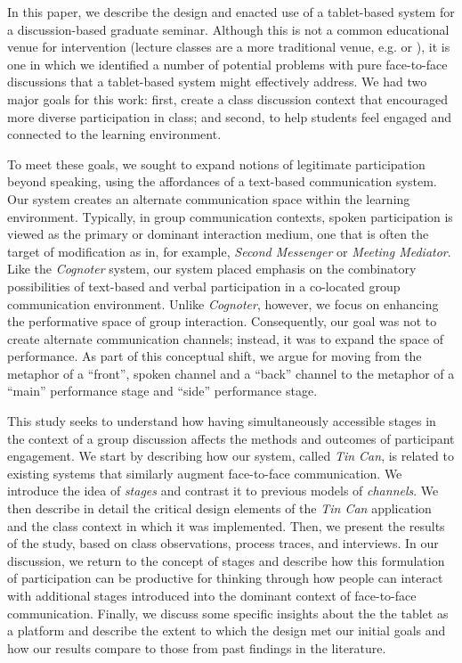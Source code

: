 In this paper, we describe the design and enacted use of a tablet-based system for a discussion-based graduate seminar. Although this is not a common educational venue for intervention (lecture classes are a more traditional venue, e.g. \citep{Kam:2005wb} or \citep{Bergstrom:wl}), it is one in which we identified a number of potential problems with pure face-to-face discussions that a tablet-based system might effectively address. We had two major goals for this work: first, create a class discussion context that encouraged more diverse participation in class; and second, to help students feel engaged and connected to the learning environment. 

To meet these goals, we sought to expand notions of legitimate participation beyond speaking, using the affordances of a text-based communication system. Our system creates an alternate communication space within the learning environment. Typically, in group communication contexts, spoken participation is viewed as the primary or dominant interaction medium, one that is often the target of modification as in, for example, \emph{Second Messenger}\citep{DiMicco:2007ie} or \emph{Meeting Mediator}\citep{Kim:2008ip}. Like the \emph{Cognoter}\citep{Tatar:1991jq} system, our system placed emphasis on the combinatory possibilities of text-based and verbal participation in a co-located group communication environment.  Unlike \emph{Cognoter}, however, we focus on enhancing the performative space of group interaction. Consequently, our goal was not to create alternate communication channels; instead, it was to expand the space of performance. As part of this conceptual shift, we argue for moving from the metaphor of a ``front'', spoken channel and a ``back'' channel to the metaphor of a ``main'' performance stage and ``side'' performance stage.

This study seeks to understand how having simultaneously accessible stages in the context of a group discussion affects the methods and outcomes of participant engagement. We start by describing how our system, called \emph{Tin Can}, is related to existing systems that similarly augment face-to-face communication. We introduce the idea of \emph{stages} and contrast it to previous models of \emph{channels}. We then describe in detail the critical design elements of the \emph{Tin Can} application and the class context in which it was implemented. Then, we present the results of the study, based on class observations, process traces, and interviews.  In our discussion, we return to the concept of stages and describe how this formulation of participation can be productive for thinking through how people can interact with additional stages introduced into the dominant context of face-to-face communication. Finally, we discuss some specific insights about the the tablet as a platform and describe the extent to which the design met our initial goals and how our results compare to those from past findings in the literature.


